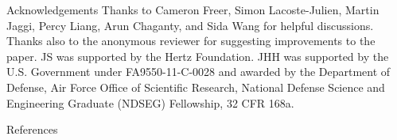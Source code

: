 \documentclass[final]{beamer}
\begin{document}
\begin{frame}{}
\begin{columns}
\begin{column}{0.48\linewidth}
%
%
%
%
%

\begin{block}{\small Acknowledgements}
{\footnotesize Thanks to Cameron Freer, Simon Lacoste-Julien, Martin Jaggi, Percy Liang, Arun Chaganty, and Sida Wang 
for helpful discussions. Thanks also to the anonymous reviewer for suggesting improvements 
to the paper. JS was supported by the Hertz Foundation. JHH was supported by the U.S. Government under FA9550-11-C-0028 and awarded by the Department of Defense, Air Force Office of Scientific Research, National Defense Science and Engineering Graduate (NDSEG) Fellowship, 32 CFR 168a.}
\end{block}

\begin{block}{\small References}
\begin{footnotesize}


\end{footnotesize}
\end{block}


\end{column}

\end{columns}
\end{frame}
\end{document}
